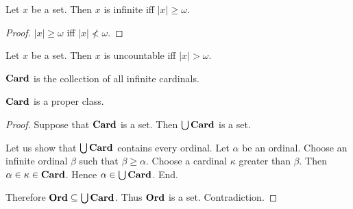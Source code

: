 \documentclass[10pt]{article}
\begin{document}
  \begin{forthel}
    \begin{proposition}
      Let $x$ be a set.
      Then $x$ is infinite iff $|x| \geq \omega$.
    \end{proposition}
    \begin{proof}
      $|x| \geq \omega$ iff $|x| \nless \omega$.
    \end{proof}
  \end{forthel}

  \begin{forthel}
    \begin{proposition}
      Let $x$ be a set.
      Then $x$ is uncountable iff $|x| > \omega$.
    \end{proposition}
  \end{forthel}

  \begin{forthel}
    \begin{definition}
      $\textbf{Card}$ is the collection of all infinite cardinals.
    \end{definition}
  \end{forthel}

  \begin{forthel}
    \begin{proposition}
      $\textbf{Card}$ is a proper class.
    \end{proposition}
    \begin{proof}
      Suppose that $\textbf{Card}$ is a set.
      Then $\bigcup \textbf{Card}$ is a set.

      Let us show that $\bigcup \textbf{Card}$ contains every ordinal.
        Let $\alpha$ be an ordinal.
        Choose an infinite ordinal $\beta$ such that $\beta \geq \alpha$.
        Choose a cardinal $\kappa$ greater than $\beta$.
        Then $\alpha \in \kappa \in \textbf{Card}$.
        Hence $\alpha \in \bigcup \textbf{Card}$.
      End.

      Therefore $\textbf{Ord} \subseteq \bigcup \textbf{Card}$.
      Thus $\textbf{Ord}$ is a set.
      Contradiction.
    \end{proof}
  \end{forthel}
\end{document}
